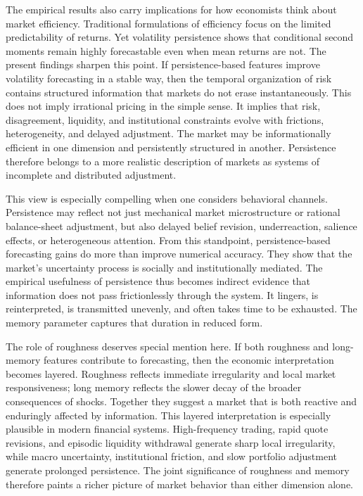 \documentclass[12pt]{article}
\begin{document}
The empirical results also carry implications for how economists think about market efficiency. Traditional formulations of efficiency focus on the limited predictability of returns. Yet volatility persistence shows that conditional second moments remain highly forecastable even when mean returns are not. The present findings sharpen this point. If persistence-based features improve volatility forecasting in a stable way, then the temporal organization of risk contains structured information that markets do not erase instantaneously. This does not imply irrational pricing in the simple sense. It implies that risk, disagreement, liquidity, and institutional constraints evolve with frictions, heterogeneity, and delayed adjustment. The market may be informationally efficient in one dimension and persistently structured in another. Persistence therefore belongs to a more realistic description of markets as systems of incomplete and distributed adjustment.

This view is especially compelling when one considers behavioral channels. Persistence may reflect not just mechanical market microstructure or rational balance-sheet adjustment, but also delayed belief revision, underreaction, salience effects, or heterogeneous attention. From this standpoint, persistence-based forecasting gains do more than improve numerical accuracy. They show that the market's uncertainty process is socially and institutionally mediated. The empirical usefulness of persistence thus becomes indirect evidence that information does not pass frictionlessly through the system. It lingers, is reinterpreted, is transmitted unevenly, and often takes time to be exhausted. The memory parameter captures that duration in reduced form.

The role of roughness deserves special mention here. If both roughness and long-memory features contribute to forecasting, then the economic interpretation becomes layered. Roughness reflects immediate irregularity and local market responsiveness; long memory reflects the slower decay of the broader consequences of shocks. Together they suggest a market that is both reactive and enduringly affected by information. This layered interpretation is especially plausible in modern financial systems. High-frequency trading, rapid quote revisions, and episodic liquidity withdrawal generate sharp local irregularity, while macro uncertainty, institutional friction, and slow portfolio adjustment generate prolonged persistence. The joint significance of roughness and memory therefore paints a richer picture of market behavior than either dimension alone.
\end{document}
